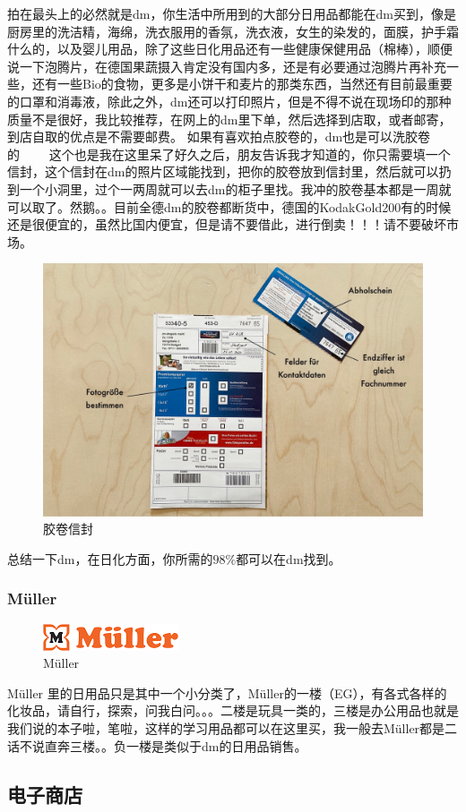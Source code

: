 \documentclass[doku]{subfiles}
\begin{document}
	拍在最头上的必然就是dm，你生活中所用到的大部分日用品都能在dm买到，像是厨房里的洗洁精，海绵，洗衣服用的香氛，洗衣液，女生的染发的，面膜，护手霜什么的，以及婴儿用品，除了这些日化用品还有一些健康保健用品（棉棒），顺便说一下泡腾片，在德国果蔬摄入肯定没有国内多，还是有必要通过泡腾片再补充一些，还有一些Bio的食物，更多是小饼干和麦片的那类东西，当然还有目前最重要的口罩和消毒液，除此之外，dm还可以打印照片，但是不得不说在现场印的那种质量不是很好，我比较推荐，在网上的dm里下单，然后选择到店取，或者邮寄，到店自取的优点是不需要邮费。 如果有喜欢拍点胶卷的，dm也是可以洗胶卷的~~~~ 这个也是我在这里呆了好久之后，朋友告诉我才知道的，你只需要填一个信封，这个信封在dm的照片区域能找到，把你的胶卷放到信封里，然后就可以扔到一个小洞里，过个一两周就可以去dm的柜子里找。我冲的胶卷基本都是一周就可以取了。然鹅。。目前全德dm的胶卷都断货中，德国的KodakGold200有的时候还是很便宜的，虽然比国内便宜，但是请不要借此，进行倒卖！！！请不要破坏市场。
	\begin{figure}
		\centering
		\includegraphics[width=0.35\linewidth]{analogfilm}
		\caption{胶卷信封}
		\label{fig:analogfilm}
	\end{figure}

	总结一下dm，在日化方面，你所需的$98\%$都可以在dm找到。
	
	\subsubsection{Müller}
	\begin{figure}[h]
		\centering
		\includegraphics[width=0.7\linewidth]{mueller}
		\caption{Müller}
		\label{fig:mueller}
	\end{figure}
	
	Müller 里的日用品只是其中一个小分类了，Müller的一楼（EG），有各式各样的化妆品，请自行，探索，问我白问。。。二楼是玩具一类的，三楼是办公用品也就是我们说的本子啦，笔啦，这样的学习用品都可以在这里买，我一般去Müller都是二话不说直奔三楼。。负一楼是类似于dm的日用品销售。 
	\subsection{电子商店}
\end{document}
